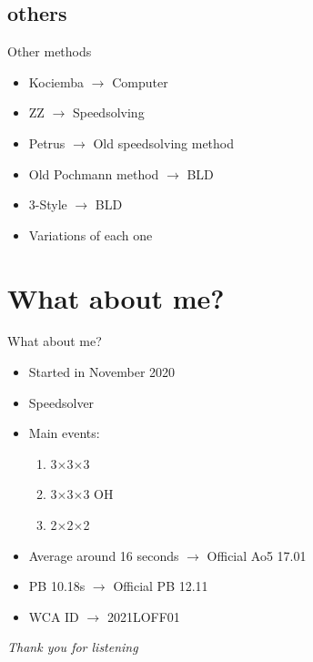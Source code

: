 \documentclass[10pt]{beamer}
\begin{document}
        \subsection{others}
            \begin{frame}{Other methods}
                \begin{itemize}
                    \pause{}
                    \item Kociemba $\rightarrow{}$ Computer \pause{}
                    \item ZZ $\rightarrow{}$ Speedsolving \pause{}
                    \item Petrus $\rightarrow{}$ Old speedsolving method \pause{}
                    \item Old Pochmann method $\rightarrow{}$ BLD \pause{}
                    \item 3-Style $\rightarrow{}$ BLD \pause{}
                    \item Variations of each one 
                \end{itemize}
            \end{frame}
    \section{What about me?}
        \begin{frame}{What about me?}
            \begin{itemize}
                \pause{}
                \item Started in November 2020 \pause{}
                \item Speedsolver \pause{}
                \item Main events: \pause{}
                \begin{enumerate}
                    \item 3$\times$3$\times$3 \pause{}
                    \item 3$\times$3$\times$3 OH \pause{}
                    \item 2$\times$2$\times$2 \pause{}
                \end{enumerate}
                \item Average around 16 seconds $\rightarrow$ Official Ao5 17.01 \pause{}
                \item PB 10.18s $\rightarrow$ Official PB 12.11\pause{}
                \item WCA ID $\rightarrow$ 2021LOFF01
            \end{itemize}
        \end{frame}
    \begin{frame}{}
        \centering \Large
        \emph{Thank you for listening}
        \end{frame}
\end{document}
